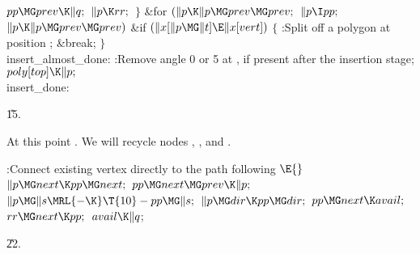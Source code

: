 ${}\\{pp}\MG\\{prev}\K\|q;{}$\6
${}\|p\K\\{rr};{}$\6
\4${}\}{}$\2\6
\&{for} ${}(\|p\K\|p\MG\\{prev}\MG\\{prev};{}$ ${}\|p\I\\{pp};{}$ ${}\|p\K\|p%
\MG\\{prev}\MG\\{prev}){}$\1\6
\&{if} ${}(\|x[\|p\MG\|t]\E\|x[\\{vert}]){}$\5
${}\{{}$\1\6
:Split off a polygon at position \X;\6
\&{break};\6
\4${}\}{}$\2\2\6
\4\\{insert\_almost\_done}:\5
:Remove angle 0 or 5 at , if present after the 
insertion stage\X;\6
${}\\{poly}[\\{top}]\K\|p;{}$\6
\4\\{insert\_done}:\par
\U15.\fi

At this point . We will
recycle nodes , , and .

\Y\B\4:Connect existing vertex  directly to the path
following \X${}\E{}$\6
$\|p\MG\\{next}\K\\{pp}\MG\\{next};{}$\6
${}\\{pp}\MG\\{next}\MG\\{prev}\K\|p;{}$\6
${}\|p\MG\|s\MRL{-{\K}}\T{10}-\\{pp}\MG\|s;{}$\6
${}\|p\MG\\{dir}\K\\{pp}\MG\\{dir};{}$\6
${}\\{pp}\MG\\{next}\K\\{avail};{}$\6
${}\\{rr}\MG\\{next}\K\\{pp};{}$\6
${}\\{avail}\K\|q{}$;\par
\U22.\fi


